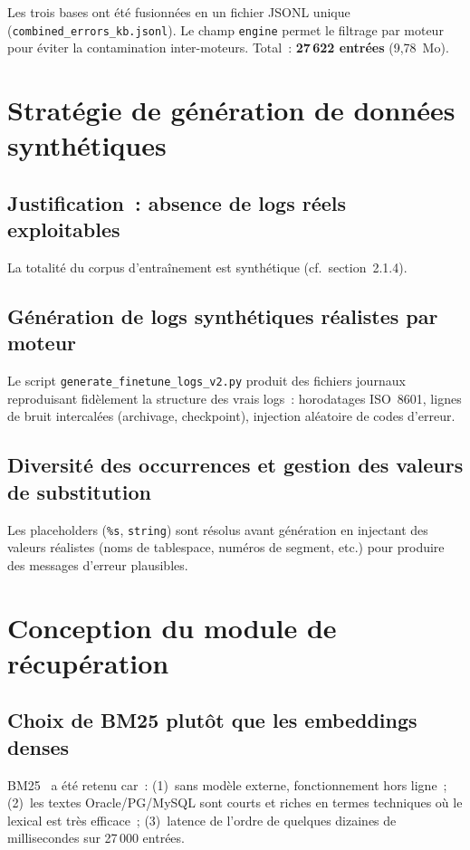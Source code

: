 \documentclass[12pt,a4paper]{report}
\begin{document}
Les trois bases ont \'et\'e fusionn\'ees en un fichier JSONL unique
(\texttt{combined\_errors\_kb.jsonl}). Le champ \texttt{engine} permet le filtrage
par moteur pour \'eviter la contamination inter-moteurs. Total~: \textbf{27\,622 entr\'ees}
(9,78~Mo).

\section{Strat\'egie de g\'en\'eration de donn\'ees synth\'etiques}

\subsection{Justification~: absence de logs r\'eels exploitables}

La totalit\'e du corpus d'entra\^inement est synth\'etique (cf.\ section~2.1.4).

\subsection{G\'en\'eration de logs synth\'etiques r\'ealistes par moteur}

Le script \texttt{generate\_finetune\_logs\_v2.py} produit des fichiers journaux
reproduisant fid\`element la structure des vrais logs~: horodatages ISO~8601,
lignes de bruit intercal\'ees (archivage, checkpoint), injection al\'eatoire de
codes d'erreur.

\subsection{Diversit\'e des occurrences et gestion des valeurs de substitution}

Les placeholders (\texttt{\%s}, \texttt{string}) sont r\'esolus avant g\'en\'eration
en injectant des valeurs r\'ealistes (noms de tablespace, num\'eros de segment, etc.)
pour produire des messages d'erreur plausibles.

\section{Conception du module de r\'ecup\'eration}

\subsection{Choix de BM25 plut\^ot que les embeddings denses}

BM25~\cite{bm25orig} a \'et\'e retenu car~: (1)~sans mod\`ele externe, fonctionnement
hors ligne~; (2)~les textes Oracle/PG/MySQL sont courts et riches en termes techniques
o\`u le lexical est tr\`es efficace~; (3)~latence de l'ordre de quelques dizaines
de millisecondes sur 27\,000 entr\'ees.
\end{document}
